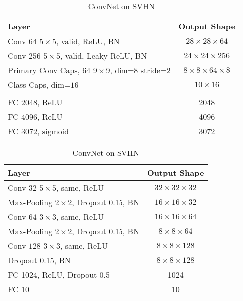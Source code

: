 \begin{table}
	\centering
	
	\begin{tabular}{lc}
		\toprule 
		Layer	& Output Shape \\ 
		\midrule 
		Conv $64$ $5\times5$, valid, ReLU, BN	&  $28\times28\times64$ \\ 
		\midrule 
		Conv $256$ $5\times5$, valid, Leaky ReLU, BN	&  $24\times24\times256$\\ 
		\midrule 
		Primary Conv Caps, $64$ $9\times9$, dim=$8$	stride=$2$ &  $8\times8\times64\times8$\\ 
		\midrule 
		Class Caps, dim=$16$	&  $10\times16$\\ 
		\midrule
		& \\
		\midrule
		FC 2048, ReLU	& 2048 \\
		\midrule
		FC 4096, ReLU	& 4096 \\
		\midrule
		FC 3072, sigmoid	& 3072\\
		\bottomrule
	\end{tabular}
	\caption{CapsNet on SVHN}
	\label{tab:capsnet:svhn}
	
	\vspace{0.75cm}
	
	\begin{tabular}{lc}
		\toprule 
		Layer	&  Output Shape \\ 
		\midrule 
		Conv $32$ $5\times5$, same,	ReLU & $32\times32\times32$ \\ 
		\midrule 
		Max-Pooling $2\times2$, Dropout 0.15, BN	&  $16\times16\times32$ \\ 
		\midrule 
		Conv $64$ $3\times3$, same, ReLU	& $16\times16\times64$ \\ 
		\midrule 
		Max-Pooling $2\times2$, Dropout 0.15, BN	& $8\times8\times64$ \\
		\midrule
		Conv $128$ $3\times3$, same, ReLU	& $8\times8\times128$ \\
		\midrule
		Dropout 0.15, BN	& $8\times8\times128$ \\
		\midrule
		FC 1024, ReLU, Dropout 0.5 & 1024 \\
		\midrule
		FC 10 & 10\\
		\bottomrule
	\end{tabular}
	\caption{ConvNet on SVHN}
	\label{tab:convnet:svhn}
\end{table}


